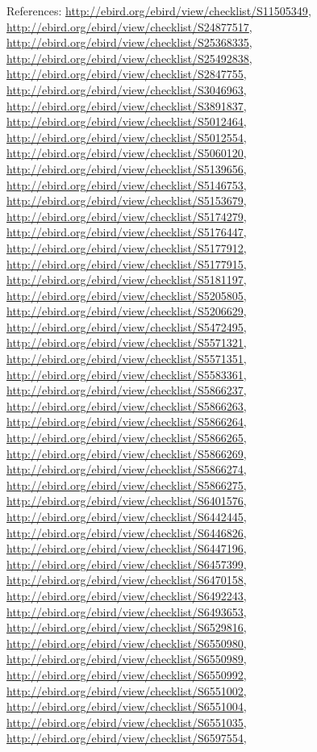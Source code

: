 \documentclass[9pt, article]{memoir}
\begin{document}
\begin{multicols}{2}
\vspace{6pt}References: 
\url{http://ebird.org/ebird/view/checklist/S11505349}, 
\url{http://ebird.org/ebird/view/checklist/S24877517}, 
\url{http://ebird.org/ebird/view/checklist/S25368335}, 
\url{http://ebird.org/ebird/view/checklist/S25492838}, 
\url{http://ebird.org/ebird/view/checklist/S2847755}, 
\url{http://ebird.org/ebird/view/checklist/S3046963}, 
\url{http://ebird.org/ebird/view/checklist/S3891837}, 
\url{http://ebird.org/ebird/view/checklist/S5012464}, 
\url{http://ebird.org/ebird/view/checklist/S5012554}, 
\url{http://ebird.org/ebird/view/checklist/S5060120}, 
\url{http://ebird.org/ebird/view/checklist/S5139656}, 
\url{http://ebird.org/ebird/view/checklist/S5146753}, 
\url{http://ebird.org/ebird/view/checklist/S5153679}, 
\url{http://ebird.org/ebird/view/checklist/S5174279}, 
\url{http://ebird.org/ebird/view/checklist/S5176447}, 
\url{http://ebird.org/ebird/view/checklist/S5177912}, 
\url{http://ebird.org/ebird/view/checklist/S5177915}, 
\url{http://ebird.org/ebird/view/checklist/S5181197}, 
\url{http://ebird.org/ebird/view/checklist/S5205805}, 
\url{http://ebird.org/ebird/view/checklist/S5206629}, 
\url{http://ebird.org/ebird/view/checklist/S5472495}, 
\url{http://ebird.org/ebird/view/checklist/S5571321}, 
\url{http://ebird.org/ebird/view/checklist/S5571351}, 
\url{http://ebird.org/ebird/view/checklist/S5583361}, 
\url{http://ebird.org/ebird/view/checklist/S5866237}, 
\url{http://ebird.org/ebird/view/checklist/S5866263}, 
\url{http://ebird.org/ebird/view/checklist/S5866264}, 
\url{http://ebird.org/ebird/view/checklist/S5866265}, 
\url{http://ebird.org/ebird/view/checklist/S5866269}, 
\url{http://ebird.org/ebird/view/checklist/S5866274}, 
\url{http://ebird.org/ebird/view/checklist/S5866275}, 
\url{http://ebird.org/ebird/view/checklist/S6401576}, 
\url{http://ebird.org/ebird/view/checklist/S6442445}, 
\url{http://ebird.org/ebird/view/checklist/S6446826}, 
\url{http://ebird.org/ebird/view/checklist/S6447196}, 
\url{http://ebird.org/ebird/view/checklist/S6457399}, 
\url{http://ebird.org/ebird/view/checklist/S6470158}, 
\url{http://ebird.org/ebird/view/checklist/S6492243}, 
\url{http://ebird.org/ebird/view/checklist/S6493653}, 
\url{http://ebird.org/ebird/view/checklist/S6529816}, 
\url{http://ebird.org/ebird/view/checklist/S6550980}, 
\url{http://ebird.org/ebird/view/checklist/S6550989}, 
\url{http://ebird.org/ebird/view/checklist/S6550992}, 
\url{http://ebird.org/ebird/view/checklist/S6551002}, 
\url{http://ebird.org/ebird/view/checklist/S6551004}, 
\url{http://ebird.org/ebird/view/checklist/S6551035}, 
\url{http://ebird.org/ebird/view/checklist/S6597554}, 

\end{multicols}
\end{document}
